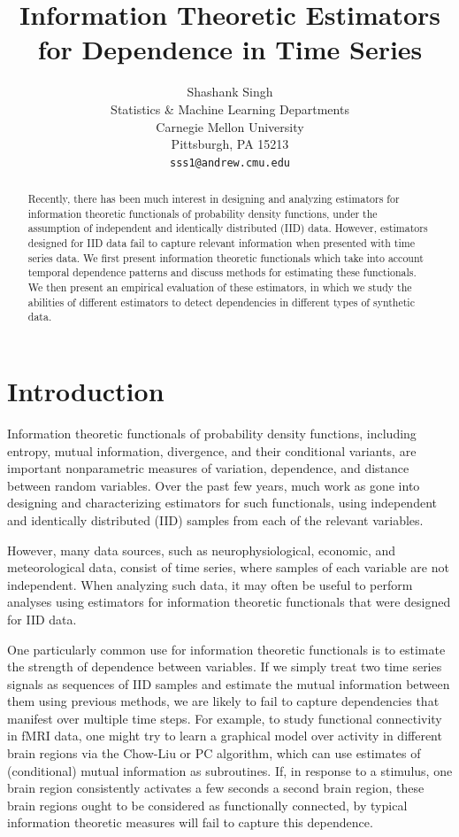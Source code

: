\documentclass{article} %
\title{Information Theoretic Estimators for Dependence in Time Series}
\author{
Shashank Singh \\
Statistics \& Machine Learning Departments \\
Carnegie Mellon University \\
Pittsburgh, PA 15213 \\
\texttt{sss1@andrew.cmu.edu}
}
\begin{document}
\maketitle

\begin{abstract}
Recently, there has been much interest in designing and analyzing estimators
for information theoretic functionals of probability density functions, under
the assumption of independent and identically distributed (IID) data. However,
estimators designed for IID data fail to capture relevant information when
presented with time series data. We first present information theoretic
functionals which take into account temporal dependence patterns and discuss
methods for estimating these functionals. We then present an empirical
evaluation of these estimators, in which we study the abilities of different
estimators to detect dependencies in different types of synthetic data.
\end{abstract}

\section{Introduction}
Information theoretic functionals of probability density functions, including
entropy, mutual information, divergence, and their conditional variants, are
important nonparametric measures of variation, dependence, and distance between
random variables. Over the past few years, much work as gone into designing and
characterizing estimators for such functionals, using independent and
identically distributed (IID) samples from each of the relevant variables.

However, many data sources, such as neurophysiological, economic, and
meteorological data, consist of time series, where samples of each variable are
not independent. When analyzing such data, it may often be useful to perform
analyses using estimators for information theoretic functionals that were
designed for IID data.

One particularly common use for information theoretic functionals is to
estimate the strength of dependence between variables. If we simply
treat two time series signals as sequences of IID samples and estimate the
mutual information between them using previous methods, we are likely to fail
to capture dependencies that manifest over multiple time steps.
For example, to study functional connectivity in fMRI data, one might try to
learn a graphical model over activity in different brain regions via the
Chow-Liu or PC algorithm, which can use estimates of (conditional) mutual
information as subroutines. If, in response to a stimulus, one brain region
consistently activates a few seconds a second brain region, these brain regions
ought to be considered as functionally connected, by typical information
theoretic measures will fail to capture this dependence.
\end{document}

